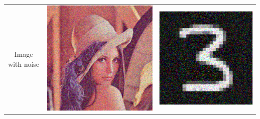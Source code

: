 \documentclass[11pt]{article}
\begin{document}
\begin{tabular}{c c c}
Image with noise & \includegraphics[scale=.3]{Lenna_noise.png} & \includegraphics[scale=.3]{3_noise.png}\\

\end{tabular}
\end{document}
